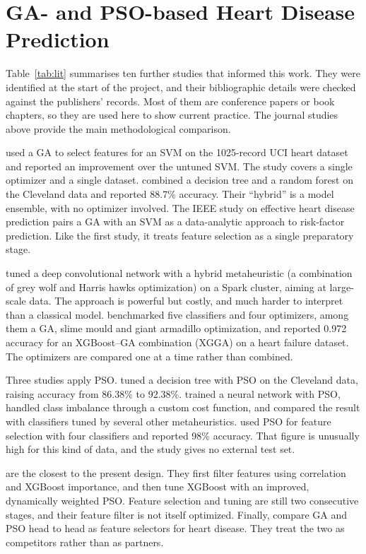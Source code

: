 \documentclass[MTech]{ugthesis}
\begin{document}
\section{GA- and PSO-based Heart Disease Prediction}
Table~\ref{tab:lit} summarises ten further studies that informed this work. They were identified at the start of the project, and their bibliographic details were checked against the publishers' records. Most of them are conference papers or book chapters, so they are used here to show current practice. The journal studies above provide the main methodological comparison.

\citet{warsi2024gasvm} used a GA to select features for an SVM on the 1025-record UCI heart dataset and reported an improvement over the untuned SVM. The study covers a single optimizer and a single dataset. \citet{kavitha2021hybrid} combined a decision tree and a random forest on the Cleveland data and reported 88.7\% accuracy. Their ``hybrid'' is a model ensemble, with no optimizer involved. The IEEE study on effective heart disease prediction \citep{effective2021gasvm} pairs a GA with an SVM as a data-analytic approach to risk-factor prediction. Like the first study, it treats feature selection as a single preparatory stage.

\citet{kanchanamala2023spark} tuned a deep convolutional network with a hybrid metaheuristic (a combination of grey wolf and Harris hawks optimization) on a Spark cluster, aiming at large-scale data. The approach is powerful but costly, and much harder to interpret than a classical model. \citet{zhang2024xgga} benchmarked five classifiers and four optimizers, among them a GA, slime mould and giant armadillo optimization, and reported 0.972 accuracy for an XGBoost--GA combination (XGGA) on a heart failure dataset. The optimizers are compared one at a time rather than combined.

Three studies apply PSO. \citet{majumder2025psodt} tuned a decision tree with PSO on the Cleveland data, raising accuracy from 86.38\% to 92.38\%. \citet{reddy2025psonn} trained a neural network with PSO, handled class imbalance through a custom cost function, and compared the result with classifiers tuned by several other metaheuristics. \citet{nagavelli2024pso} used PSO for feature selection with four classifiers and reported 98\% accuracy. That figure is unusually high for this kind of data, and the study gives no external test set.

\citet{cao2025dlpso} are the closest to the present design. They first filter features using correlation and XGBoost importance, and then tune XGBoost with an improved, dynamically weighted PSO. Feature selection and tuning are still two consecutive stages, and their feature filter is not itself optimized. Finally, \citet{wadhawan2026gavspso} compare GA and PSO head to head as feature selectors for heart disease. They treat the two as competitors rather than as partners.
\end{document}
